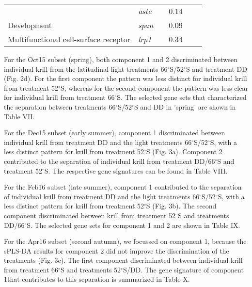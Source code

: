 \begin{table}[]
\begin{tabular}{@{}llllll@{}}
                                      & \textit{astc}   & \cellcolor[HTML]{C0C0C0}      & 0.14           & \cellcolor[HTML]{C0C0C0}      &          \\
Development                           & \textit{span}   & \cellcolor[HTML]{C0C0C0}      & 0.09           & \cellcolor[HTML]{C0C0C0}      &          \\
Multifunctional cell-surface receptor & \textit{lrp1}   & \cellcolor[HTML]{C0C0C0}      & 0.34           & \cellcolor[HTML]{C0C0C0}      &          \\ \bottomrule
\end{tabular}
\end{table}




For the Oct15 subset (spring), both component 1 and 2 discriminated between
individual krill from the latitudinal light treatments
66$^{\circ}$S/52$^{\circ}$S and treatment DD (Fig. 2d). For the first component
the pattern was less distinct for individual krill from treatment
52$^{\circ}$S, whereas for the second component the pattern was less clear for
individual krill from treatment 66$^{\circ}$S. The selected gene sets that
characterized the separation between treatments 66$^{\circ}$S/52$^{\circ}$S and
DD in 'spring' are shown in Table VII.





For the Dec15 subset (early summer), component 1 discriminated between
individual krill from treatment DD and the light treatments
66$^{\circ}$S/52$^{\circ}$S, with a less distinct pattern for krill from
treatment 52$^{\circ}$S (Fig. 3a). Component 2 contributed to the separation of
individual krill from treatment DD/66$^{\circ}$S and treatment 52$^{\circ}$S. The
respective gene signatures can be found in Table VIII.

For the Feb16 subset (late summer), component 1 contributed to the separation
of individual krill from treatment DD and the light treatments
66$^{\circ}$S/52$^{\circ}$S, with a less distinct pattern for krill from
treatment 52$^{\circ}$S (Fig. 3b). The second component discriminated between
krill from treatment 52$^{\circ}$S and treatments DD/66$^{\circ}$S. The selected
gene sets for component 1 and 2 are shown in Table IX.

For the Apr16 subset (second autumn), we focussed on component 1, because the
sPLS-DA results for component 2 did not improve the discrimination of the
treatments (Fig. 3c). The first component discriminated between individual
krill from treatment 66$^{\circ}$S and treatments 52$^{\circ}$S/DD. The gene
signature of component 1that contributes to this separation is summarized in
Table X.

